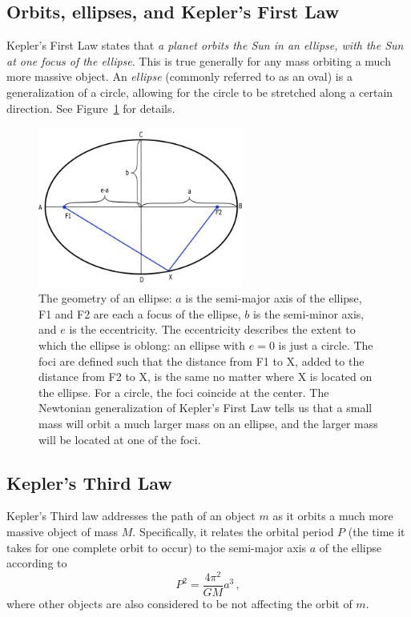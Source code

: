 \subsection{Orbits, ellipses, and Kepler's First Law}
Kepler's First Law states that \textit{a planet orbits the Sun in an ellipse, with the Sun at one focus of the ellipse}. This is true generally for any mass orbiting a much more massive object. An \textit{ellipse} (commonly referred to as an oval) is a generalization of a circle, allowing for the circle to be stretched along a certain direction. See Figure~\ref{gc:fig:ellipse} for details.

\begin{figure}
	\centering
	\includegraphics[width=0.6\textwidth]{galactic-center/ellipse.png}
	\caption{The geometry of an ellipse: $a$ is the semi-major axis of the ellipse, F1 and F2 are each a
		focus of the ellipse, $b$ is the semi-minor axis, and $e$ is the eccentricity. The eccentricity describes
		the extent to which the ellipse is oblong: an ellipse with $e = 0$ is just a circle. The foci are defined such
		that the distance from F1 to X, added to the distance from F2 to X, is the same no matter where X
		is located on the ellipse. For a circle, the foci coincide at the center. The Newtonian generalization of
		Kepler's First Law tells us that a small mass will orbit a much larger mass on an ellipse, and the larger
		mass will be located at one of the foci.}\label{gc:fig:ellipse}
\end{figure}

\subsection{Kepler's Third Law}

Kepler’s Third law addresses the path of an object $m$ as it orbits a much more massive object of mass $M$. Specifically, it relates the orbital period $P$ (the time it takes for one complete orbit to occur) to the semi-major axis $a$ of the ellipse according to
\begin{equation}\label{gc:eq:kepler-3}
P^2 = \frac{4 \pi^2}{G M} a^3 \,,
\end{equation}
where other objects are also considered to be not affecting the orbit of $m$. %

